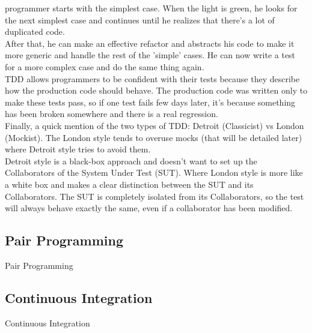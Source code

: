 programmer starts with the simplest case.
When the light is green, he looks for the next simplest case and
continues until he realizes that there's a lot of duplicated code. \\
After that, he can make an effective refactor and abstracts his code to
make it more generic and handle the rest of the 'simple' cases.
He can now write a test for a more complex case and do the same thing
again. \\
\newline
TDD allows programmers to be confident with their tests because they
describe how the production code should behave.
The production code was written only to make these tests pass, so if
one test fails few days later, it's because something has been broken
somewhere and there is a real regression. \\
\newline
Finally, a quick mention of the two types of TDD: Detroit (Classicist)
vs London (Mockist).
The London style tends to overuse mocks (that will be detailed later)
where Detroit style tries to avoid them. \\
Detroit style is a black-box approach and doesn't want to set up the
Collaborators of the System Under Test (SUT).
Where London style is more like a white box and makes a clear distinction
between the SUT and its Collaborators.
The SUT is completely isolated from its Collaborators, so the test will
always behave exactly the same, even if a collaborator has been modified.

\subsection{Pair Programming}\label{subsec:pair-programming}
Pair Programming

\subsection{Continuous Integration}\label{subsec:continuous-integration}
Continuous Integration
